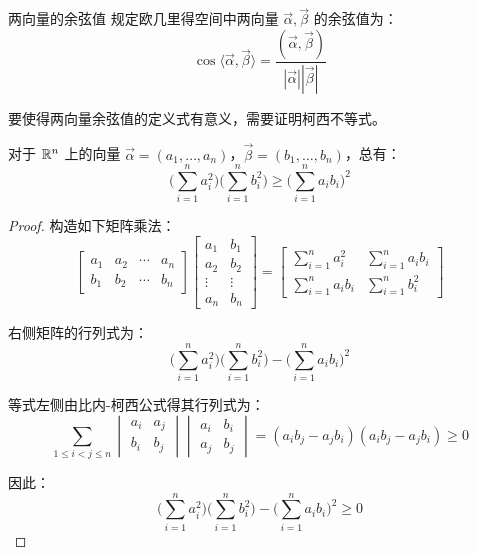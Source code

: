 \begin{definition}{两向量的余弦值}
	规定欧几里得空间中两向量 $\vec \alpha, \vec \beta$ 的余弦值为：
	$$
	\cos \langle \vec \alpha, \vec \beta \rangle = \dfrac{(\vec \alpha, \vec \beta)}{|\vec \alpha| |\vec \beta|}
	$$
\end{definition}

要使得两向量余弦值的定义式有意义，需要证明柯西不等式。

\begin{theorem}[柯西不等式]
	对于 $\mathbb R^n$ 上的向量 $\vec \alpha = (a_1, \ldots, a_n)$，$\vec \beta = (b_1, \ldots, b_n)$，总有：
	$$
	\biggl( \sum\limits_{i = 1}^n a_i^2 \biggr) \biggl( \sum\limits_{i = 1}^n b_i^2 \biggr) \ge \biggl( \sum\limits_{i = 1}^n a_i b_i \biggr)^2
	$$
\end{theorem}

\begin{proof}
	构造如下矩阵乘法：
	$$
	\begin{bmatrix}
		a_1 & a_2 & \cdots & a_n
		\\
		b_1 & b_2 & \cdots & b_n
	\end{bmatrix}
	\begin{bmatrix}
		a_1 & b_1
		\\
		a_2 & b_2
		\\
		\vdots & \vdots
		\\
		a_n & b_n
	\end{bmatrix}
	=
	\begin{bmatrix}
		\sum\limits_{i = 1}^n a_i^2 & \sum\limits_{i = 1}^n a_i b_i
		\\
		\sum\limits_{i = 1}^n a_i b_i & \sum\limits_{i = 1}^n b_i^2
	\end{bmatrix}
	$$

	右侧矩阵的行列式为：
	$$
	\biggl( \sum\limits_{i = 1}^n a_i^2 \biggr) \biggl( \sum\limits_{i = 1}^n b_i^2 \biggr) - \biggl( \sum\limits_{i = 1}^n a_i b_i \biggr)^2
	$$

	等式左侧由比内-柯西公式得其行列式为：
	$$
	\sum\limits_{1 \le i < j \le n} \begin{vmatrix} a_i & a_j \\ b_i & b_j \end{vmatrix} \begin{vmatrix} a_i & b_i \\ a_j & b_j \end{vmatrix} = (a_i b_j - a_j b_i)(a_i b_j - a_j b_i) \ge 0
	$$

	因此：
	$$
	\biggl( \sum\limits_{i = 1}^n a_i^2 \biggr) \biggl( \sum\limits_{i = 1}^n b_i^2 \biggr) - \biggl( \sum\limits_{i = 1}^n a_i b_i \biggr)^2 \ge 0
	$$
\end{proof}